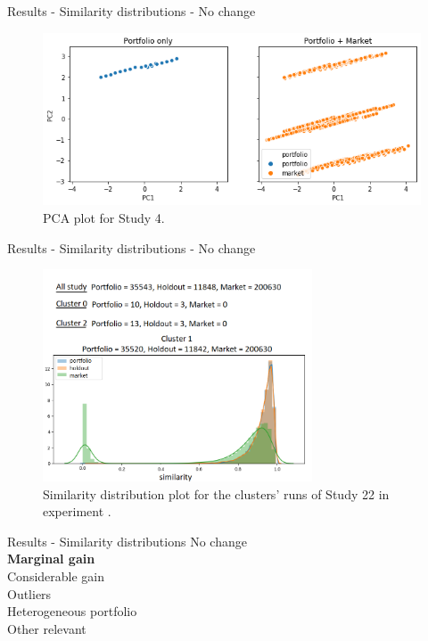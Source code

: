 
\begin{frame}{Results - Similarity distributions - No change}
    \begin{figure}
       \centering
       \includegraphics[width=\linewidth]{fig/ch4-study-4-pca-plot.png}
       \caption{PCA plot for Study 4.}
    \end{figure}
\end{frame}


\begin{frame}{Results - Similarity distributions - No change}
    \begin{figure}
       \centering
       \includegraphics[width=8cm]{fig/ch4-study-22-clusters-simi-plot.png}
       \caption{Similarity distribution plot for the clusters' runs of Study 22 in experiment \nameExperimentI{}.}
    \end{figure}
\end{frame}


\begin{frame}{Results - Similarity distributions}
    No change \\ 
    \vspace{0.5cm}
    \textbf{Marginal gain} \\
    \vspace{0.5cm}
    Considerable gain \\
    \vspace{0.5cm}
    Outliers \\
    \vspace{0.5cm}
    Heterogeneous portfolio \\
    \vspace{0.5cm}
    Other relevant 
\end{frame}

